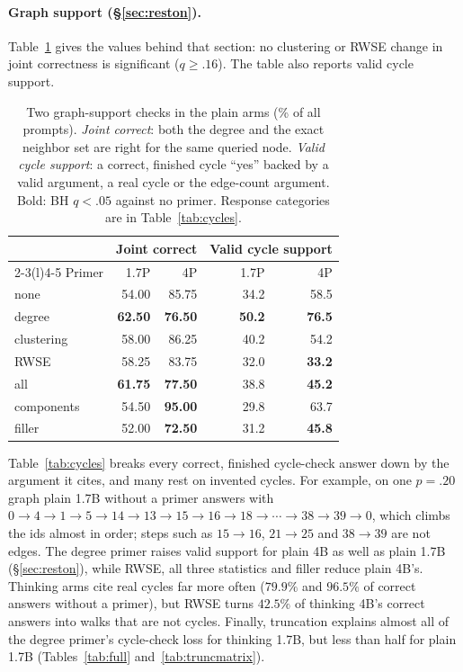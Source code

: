 \documentclass[11pt]{article}
\begin{document}
\paragraph{Graph support (\S\ref{sec:reston}).} Table~\ref{tab:support} gives the values behind that section: no clustering or RWSE change in joint correctness is significant ($q\geq.16$). The table also reports valid cycle support. %
\begin{table}[H]
\centering\footnotesize\setlength{\tabcolsep}{7pt}
\begin{tabular}{lrrrr}
\toprule
 & \multicolumn{2}{c}{Joint correct} & \multicolumn{2}{c}{Valid cycle support}\\
\cmidrule(lr){2-3}\cmidrule(l){4-5}
Primer & 1.7P & 4P & 1.7P & 4P\\
\midrule
none & 54.00 & 85.75 & 34.2 & 58.5\\ %
degree & \textbf{62.50} & \textbf{76.50} & \textbf{50.2} & \textbf{76.5}\\ %
clustering & 58.00 & 86.25 & 40.2 & 54.2\\ %
RWSE & 58.25 & 83.75 & 32.0 & \textbf{33.2}\\ %
all & \textbf{61.75} & \textbf{77.50} & 38.8 & \textbf{45.2}\\ %
components & 54.50 & \textbf{95.00} & 29.8 & 63.7\\ %
filler & 52.00 & \textbf{72.50} & 31.2 & \textbf{45.8}\\ %
\bottomrule
\end{tabular}
\caption{Two graph-support checks in the plain arms (\% of all prompts). \emph{Joint correct}: both the degree and the exact neighbor set are right for the same queried node. \emph{Valid cycle support}: a correct, finished cycle ``yes'' backed by a valid argument, a real cycle or the edge-count argument. Bold: BH $q<.05$ against no primer. Response categories are in Table~\ref{tab:cycles}.}
\label{tab:support}
\end{table}



Table~\ref{tab:cycles} breaks every correct, finished cycle-check answer down by the argument it cites, and many rest on invented cycles. For example, on one $p=.20$ graph plain 1.7B without a primer answers with $0\to4\to1\to5\to14\to13\to15\to16\to18\to\cdots\to38\to39\to0$, which climbs the ids almost in order; steps such as $15\to16$, $21\to25$ and $38\to39$ are not edges. %
The degree primer raises valid support for plain 4B as well as plain 1.7B (\S\ref{sec:reston}), while RWSE, all three statistics and filler reduce plain 4B's. %
Thinking arms cite real cycles far more often ($79.9\%$ and $96.5\%$ of correct answers without a primer), but RWSE turns $42.5\%$ of thinking 4B's correct answers into walks that are not cycles. %
Finally, truncation explains almost all of the degree primer's cycle-check loss for thinking 1.7B, but less than half for plain 1.7B (Tables~\ref{tab:full} and~\ref{tab:truncmatrix}). %
\end{document}
